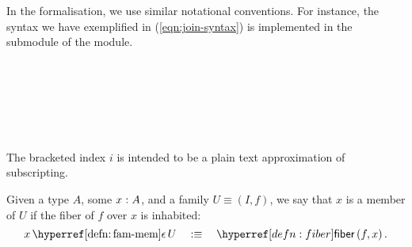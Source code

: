 In the \veragda{} formalisation, we use similar notational conventions. For instance, the
syntax we have exemplified in (\ref{eqn:join-syntax}) is implemented in the
 submodule of the  module.
\begin{code}%
\>[0]\AgdaSpace{}%
\AgdaSpace{}%
\AgdaSymbol{(}\AgdaSpace{}%
\AgdaSymbol{:}\AgdaSpace{}%
\AgdaSpace{}%
\AgdaSymbol{)}\AgdaSpace{}%
\AgdaSymbol{\{}\AgdaSpace{}%
\AgdaSymbol{:}\AgdaSpace{}%
\AgdaSymbol{\}}\AgdaSpace{}%
\AgdaSymbol{(}\AgdaSpace{}%
\AgdaSymbol{:}\AgdaSpace{}%
\AgdaSpace{}%
\AgdaSpace{}%
\AgdaSpace{}%
\AgdaSpace{}%
\AgdaSymbol{)}\AgdaSpace{}%
\<%
\\
%
\\[\AgdaEmptyExtraSkip]%
\>[0][@{}l@{\AgdaIndent{0}}]%
\>[2]\AgdaSpace{}%
\AgdaSymbol{:}\AgdaSpace{}%
\AgdaSymbol{\{}\AgdaSpace{}%
\AgdaSymbol{:}\AgdaSpace{}%
\AgdaSpace{}%
\AgdaSymbol{\}}\AgdaSpace{}%
\AgdaSpace{}%
\AgdaSymbol{(}\AgdaSpace{}%
\AgdaSpace{}%
\AgdaSymbol{)}\AgdaSpace{}%
\AgdaSpace{}%
\<%
\\
%
\>[2]\AgdaSpace{}%
\AgdaSymbol{\{}\AgdaSpace{}%
\AgdaSymbol{=}\AgdaSpace{}%
\AgdaSymbol{\}}\AgdaSpace{}%
\AgdaSpace{}%
\AgdaSymbol{=}\AgdaSpace{}%
\AgdaSpace{}%
\AgdaSymbol{(}\AgdaSpace{}%
\AgdaOperator{\AgdaInductiveConstructor{,}}\AgdaSpace{}%
\AgdaSymbol{)}\<%
\\
%
\\[\AgdaEmptyExtraSkip]%
%
\>[2]\AgdaSpace{}%
\AgdaSpace{}%
\AgdaSpace{}%
\AgdaSpace{}%
\AgdaSpace{}%
\AgdaSymbol{)}\AgdaSpace{}%
\AgdaSymbol{=}\AgdaSpace{}%
\AgdaSpace{}%
\AgdaSpace{}%
\AgdaSpace{}%
\<%
\end{code}

The bracketed index $i$ is intended to be a plain text approximation
of subscripting.

\begin{defn}\label{defn:fam-mem}
  Given a type $A$, some $x\hspace{0.1mm}:\hspace{0.1mm}A$, and a family $U \equiv (I, f)$, we say
  that $x$ is a member of $U$ if the fiber of $f$ over $x$ is inhabited:
  \begin{equation*}
    \memfam{x}{U} \quad\is\quad \fiber{f}{x}.
  \end{equation*}
\end{defn}

